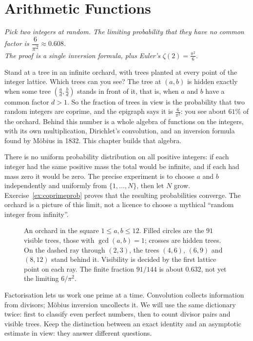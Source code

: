 \chapter{Arithmetic Functions}\label{ch:functions}

\begin{center}\itshape
Pick two integers at random. The limiting probability that they have no common factor is $\dfrac6{\pi^2}\approx0.608$.\\
The proof is a single inversion formula, plus Euler's $\zeta(2)=\frac{\pi^2}6$.
\end{center}

Stand at a tree in an infinite orchard, with trees planted at every point of the integer lattice. Which trees can you see? The tree at $(a,b)$ is hidden
exactly when some tree $(\frac ad,\frac bd)$ stands in front of it, that is, when $a$ and $b$ have a common factor $d>1$. So the fraction of trees in view
is the probability that two random integers are coprime, and the epigraph says it is $\frac6{\pi^2}$: you see about $61\%$ of the orchard. Behind this
number is a whole algebra of functions on the integers, with its own multiplication, Dirichlet's convolution, and an inversion formula found by
M\"obius in 1832. This chapter builds that algebra.

There is no uniform probability distribution on all positive integers: if each
integer had the same positive mass the total would be infinite, and if each had
mass zero it would be zero. The precise experiment is to choose $a$ and $b$
independently and uniformly from $\{1,\dots,N\}$, then let $N$ grow.
Exercise~\ref{ex:coprimeprob} proves that the resulting probabilities converge.
The orchard is a picture of this limit, not a licence to choose a mythical
``random integer from infinity''.

\begin{figure}[ht]
\centering
{}
\caption{An orchard in the square $1\le a,b\le12$. Filled circles are the
$91$ visible trees, those with $\gcd(a,b)=1$; crosses are hidden trees. On the
dashed ray through $(2,3)$, the trees $(4,6)$, $(6,9)$ and $(8,12)$ stand behind
it. Visibility is decided by the first lattice point on each ray. The finite
fraction $91/144$ is about $0.632$, not yet the limiting $6/\pi^2$.}
\label{fig:orchard}
\end{figure}

\begin{reminder}
Factorisation lets us work one prime at a time. Convolution collects information
from divisors; M\"obius inversion uncollects it. We will use the same dictionary
twice: first to classify even perfect numbers, then to count divisor pairs and
visible trees. Keep the distinction between an exact identity and an asymptotic
estimate in view: they answer different questions.
\end{reminder}

